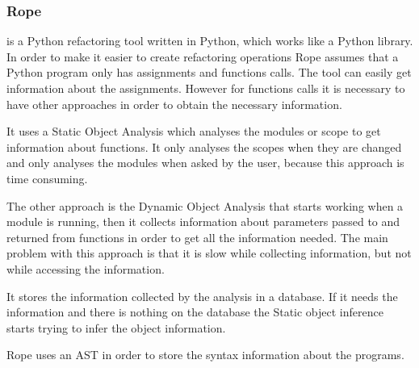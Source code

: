 
\subsubsection{Rope}

 is a Python refactoring tool written in Python, which works like a Python library.
In order to make it easier to create refactoring operations Rope assumes that a Python program only has assignments and functions calls. %
The tool can easily get information about the assignments. However for functions calls it is necessary to have other approaches in order to obtain the necessary information. 

It uses a Static Object Analysis which analyses the modules or scope to get information about functions. It only analyses the scopes when they are changed and only analyses the modules when asked by the user, because this approach is time consuming. 

The other approach is the Dynamic Object Analysis that starts working when a module is running, then it collects information about parameters passed to and returned from functions in order to get all the information needed. The main problem with this approach is that it is slow while collecting information, but not while accessing the information.

It stores the information collected by the analysis in a database. If it needs the information and there is nothing on the database the Static object inference starts trying to infer the object information.

Rope uses an AST in order to store the syntax information about the programs.






